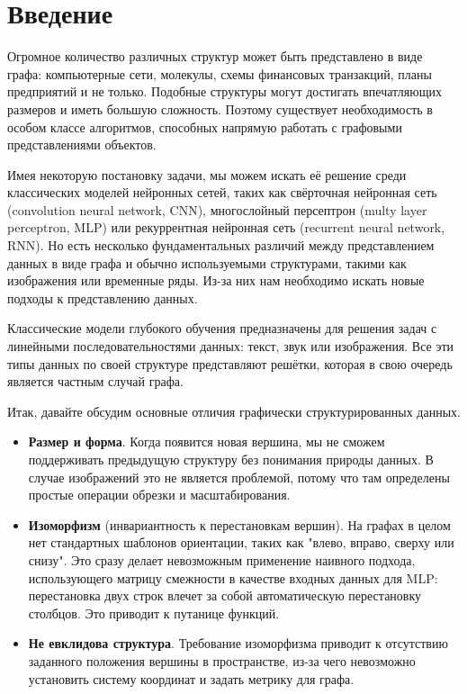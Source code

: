 \documentclass[12pt]{article}
\begin{document}
\addtocounter{page}{1}

\newpage

\tableofcontents

\newpage

\section{Введение}

Огромное количество различных структур может быть представлено в виде графа: компьютерные сети, молекулы, схемы финансовых транзакций, планы предприятий и не только. Подобные структуры могут достигать впечатляющих размеров и иметь большую сложность. Поэтому существует необходимость в особом классе алгоритмов, способных напрямую работать с графовыми представлениями объектов.

Имея некоторую постановку задачи, мы можем искать её решение среди классических моделей нейронных сетей, таких как свёрточная нейронная сеть (convolution neural network, CNN), многослойный персептрон (multy layer perceptron, MLP) или рекуррентная нейронная сеть (recurrent neural network, RNN). Но есть несколько фундаментальных различий между представлением данных в виде графа и обычно используемыми структурами, такими как изображения или временные ряды. Из-за них нам необходимо искать новые подходы к представлению данных. 

Классические модели глубокого обучения предназначены для решения задач с линейными последовательностями данных: текст, звук или изображения. Все эти типы данных по своей структуре представляют решётки, которая в свою очередь является частным случай графа.

Итак, давайте обсудим основные отличия графически структурированных данных.

\begin{itemize}
    \item \textbf{Размер и форма}. Когда появится новая вершина, мы не сможем поддерживать предыдущую структуру без понимания природы данных. В случае изображений это не является проблемой, потому что там определены простые операции обрезки и масштабирования.
    
    \item \textbf{Изоморфизм} (инвариантность к перестановкам вершин). На графах в целом нет стандартных шаблонов ориентации, таких как "влево, вправо, сверху или снизу". Это сразу делает невозможным применение наивного подхода, использующего матрицу смежности в качестве входных данных для MLP: перестановка двух строк влечет за собой автоматическую перестановку столбцов. Это приводит к путанице функций.
    
    \item \textbf{Не евклидова структура}. Требование изоморфизма приводит к отсутствию заданного положения вершины в пространстве, из-за чего невозможно установить систему координат и задать метрику для графа.
\end{itemize}
\end{document}
